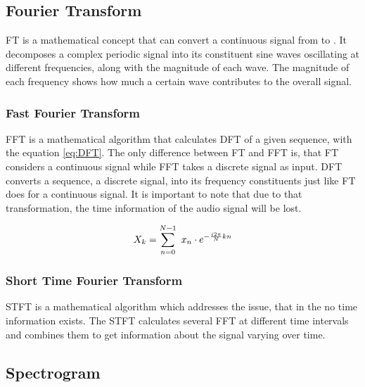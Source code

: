\subsection{Fourier Transform}
\label{sub:Fourier-Transform}

\gls{FT} is a mathematical concept that can convert a continuous signal from  to . It decomposes a complex periodic signal into its constituent sine waves oscillating at different frequencies, along with the magnitude of each wave. The magnitude of each frequency shows how much a certain wave contributes to the overall signal.

\subsubsection{Fast Fourier Transform}
\label{subsub:Fast-Fourier-Transform}

\gls{FFT} is a mathematical algorithm that calculates \gls{DFT} of a given sequence, with the equation \ref{eq:DFT}. The only difference between \gls{FT} and \gls{FFT} is, that \gls{FT} considers a continuous signal while \gls{FFT} takes a discrete signal as input. \gls{DFT} converts a sequence, a discrete signal, into its frequency constituents just like \gls{FT} does for a continuous signal. It is important to note that due to that transformation, the time information of the audio signal will be lost.

\begin{equation}
    \centering
    X_k = \sum_{n=0}^{N-1} \ x_n \cdot e^{-\frac{i2\pi}{N}kn}
    \label{eq:DFT}
\end{equation}

\subsubsection{Short Time Fourier Transform}
\label{subsub:Short-Time-Fourier-Transform}

\gls{STFT} is a mathematical algorithm which addresses the issue, that in the  no time information exists. The \gls{STFT} calculates several \gls{FFT} at different time intervals and combines them to get information about the signal varying over time.

\subsection{Spectrogram}
\label{sub:Spectrogram}

